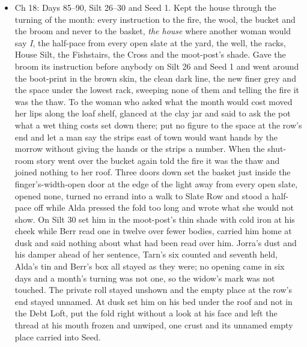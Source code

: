 \documentclass{design/chronicle}
\begin{document}
{\begin{itemize}[leftmargin=1.4em,itemsep=1pt,topsep=3pt,parsep=0pt]
\item Ch 18: Days 85–90, Silt 26–30 and Seed 1. Kept the house through the turning of the month: every instruction to the fire, the wool, the bucket and the broom and never to the basket, \emph{the house} where another woman would say \emph{I}, the half-pace from every open slate at the yard, the well, the racks, House Silt, the Fishstairs, the Cross and the moot-post’s shade. Gave the broom its instruction before anybody on Silt 26 and Seed 1 and went around the boot-print in the brown skin, the clean dark line, the new finer grey and the space under the lowest rack, sweeping none of them and telling the fire it was the thaw. To the woman who asked what the month would cost moved her lips along the loaf shelf, glanced at the clay jar and said to ask the pot what a wet thing costs set down there; put no figure to the space at the row’s end and let a man say the strips east of town would want hands by the morrow without giving the hands or the strips a number. When the shut-room story went over the bucket again told the fire it was the thaw and joined nothing to her roof. Three doors down set the basket just inside the finger’s-width-open door at the edge of the light away from every open slate, opened none, turned no errand into a walk to Slate Row and stood a half-pace off while Alda pressed the fold too long and wrote what she would not show. On Silt 30 set him in the moot-post’s thin shade with cold iron at his cheek while Berr read one in twelve over fewer bodies, carried him home at dusk and said nothing about what had been read over him. Jorra’s dust and his damper ahead of her sentence, Tarn’s six counted and seventh held, Alda’s tin and Berr’s box all stayed as they were; no opening came in six days and a month’s turning was not one, so the widow’s mark was not touched. The private roll stayed unshown and the empty place at the row’s end stayed unnamed. At dusk set him on his bed under the roof and not in the Debt Loft, put the fold right without a look at his face and left the thread at his mouth frozen and unwiped, one crust and its unnamed empty place carried into Seed.

\end{itemize}

\begin{itemize}[leftmargin=1.4em,itemsep=1pt,topsep=3pt,parsep=0pt]


\end{itemize}}
\end{document}
